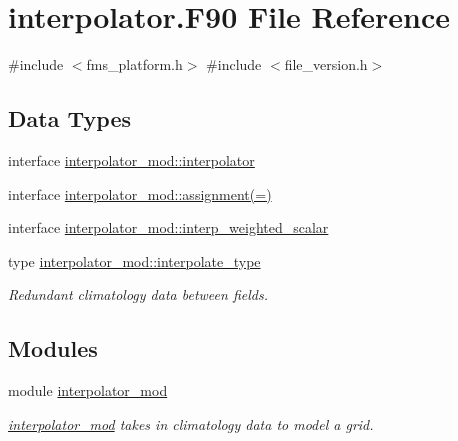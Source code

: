 \hypertarget{interpolator_8_f90}{}\section{interpolator.\+F90 File Reference}
\label{interpolator_8_f90}
{\ttfamily \#include $<$fms\+\_\+platform.\+h$>$}\newline
{\ttfamily \#include $<$file\+\_\+version.\+h$>$}\newline
\subsection*{Data Types}
\begin{DoxyCompactItemize}
\item 
interface \hyperlink{interfaceinterpolator__mod_1_1interpolator}{interpolator\+\_\+mod\+::interpolator}
\item 
interface \hyperlink{interfaceinterpolator__mod_1_1assignment_07_0A_08}{interpolator\+\_\+mod\+::assignment(=)}
\item 
interface \hyperlink{interfaceinterpolator__mod_1_1interp__weighted__scalar}{interpolator\+\_\+mod\+::interp\+\_\+weighted\+\_\+scalar}
\item 
type \hyperlink{structinterpolator__mod_1_1interpolate__type}{interpolator\+\_\+mod\+::interpolate\+\_\+type}
\begin{DoxyCompactList}\small\item\em Redundant climatology data between fields. \end{DoxyCompactList}\end{DoxyCompactItemize}
\subsection*{Modules}
\begin{DoxyCompactItemize}
\item 
module \hyperlink{namespaceinterpolator__mod}{interpolator\+\_\+mod}
\begin{DoxyCompactList}\small\item\em \hyperlink{namespaceinterpolator__mod}{interpolator\+\_\+mod} takes in climatology data to model a grid. \end{DoxyCompactList}\end{DoxyCompactItemize}
